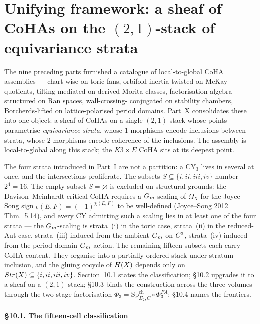 \part{Unifying framework: a sheaf of CoHAs on the $(2,1)$-stack of equivariance strata}
\label{gluing:part:x-unifying}

The nine preceding parts furnished a catalogue of local-to-global CoHA
assemblies --- chart-wise on toric fans, orbifold-inertia-twisted on
McKay quotients, tilting-mediated on derived Morita classes,
factorisation-algebra-structured on Ran spaces, wall-crossing-
conjugated on stability chambers, Borcherds-lifted on
lattice-polarised period domains. Part~X consolidates these into one
object: a sheaf of CoHAs on a single $(2,1)$-stack whose points
parametrise \emph{equivariance strata}, whose $1$-morphisms encode
inclusions between strata, whose $2$-morphisms encode coherence of the
inclusions. The assembly is local-to-global along this stack; the
$K3\times E$ CoHA sits at its deepest point.

The four strata introduced in Part~I are not a partition: a CY$_3$
lives in several at once, and the intersections proliferate. The
subsets $S\subseteq\{i,ii,iii,iv\}$ number $2^{4}=16$. The empty
subset $S=\varnothing$ is excluded on structural grounds: the
Davison--Meinhardt critical CoHA requires a $G_{m}$-scaling of
$\Omega_{X}$ for the Joyce--Song sign $\epsilon(E,F)=(-1)^{\chi(E,F)}$
to be well-defined (Joyce--Song 2012 Thm.~5.14), and every CY
admitting such a scaling lies in at least one of the four strata ---
the $G_{m}$-scaling is strata~(i) in the toric case, strata~(ii) in the
reduced-Aut case, strata~(iii) induced from the ambient $G_{m}$ on
$C^{3}$, strata~(iv) induced from the period-domain $G_{m}$-action.
The remaining fifteen subsets each carry CoHA content. They organise
into a partially-ordered stack under stratum-inclusion, and the
gluing cocycle of $H(X)$ depends only on $Str(X)\subseteq\{i,ii,iii,iv\}$.
Section~10.1 states the classification; \S 10.2 upgrades it to a
sheaf on a $(2,1)$-stack; \S 10.3 binds the construction across the
three volumes through the two-stage factorisation
$\Phi_{3}=\mathrm{Sp}^{\mathrm{ch}}_{\Sigma_{2},C}\circ\Phi^{FA}_{3}$;
\S 10.4 names the frontiers.

\subsection*{\S 10.1. The fifteen-cell classification}
\label{gluing:sec:10-1-fifteen-cell}

